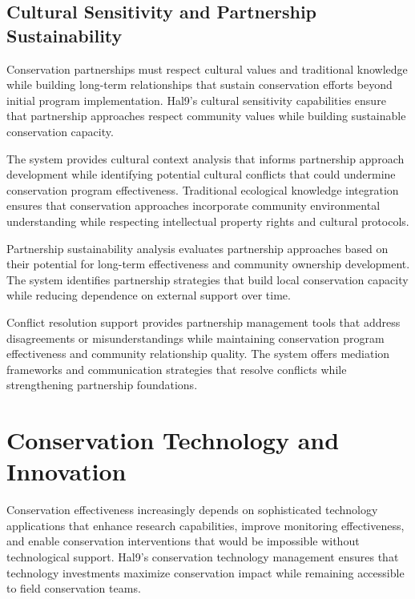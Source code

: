 \documentclass[
  Letterpaper,
]{scrbook}
\begin{document}
\subsection{Cultural Sensitivity and Partnership
Sustainability}\label{cultural-sensitivity-and-partnership-sustainability}

Conservation partnerships must respect cultural values and traditional
knowledge while building long-term relationships that sustain
conservation efforts beyond initial program implementation. Hal9's
cultural sensitivity capabilities ensure that partnership approaches
respect community values while building sustainable conservation
capacity.

The system provides cultural context analysis that informs partnership
approach development while identifying potential cultural conflicts that
could undermine conservation program effectiveness. Traditional
ecological knowledge integration ensures that conservation approaches
incorporate community environmental understanding while respecting
intellectual property rights and cultural protocols.

Partnership sustainability analysis evaluates partnership approaches
based on their potential for long-term effectiveness and community
ownership development. The system identifies partnership strategies that
build local conservation capacity while reducing dependence on external
support over time.

Conflict resolution support provides partnership management tools that
address disagreements or misunderstandings while maintaining
conservation program effectiveness and community relationship quality.
The system offers mediation frameworks and communication strategies that
resolve conflicts while strengthening partnership foundations.

\section{Conservation Technology and
Innovation}\label{conservation-technology-and-innovation}

Conservation effectiveness increasingly depends on sophisticated
technology applications that enhance research capabilities, improve
monitoring effectiveness, and enable conservation interventions that
would be impossible without technological support. Hal9's conservation
technology management ensures that technology investments maximize
conservation impact while remaining accessible to field conservation
teams.
\end{document}

